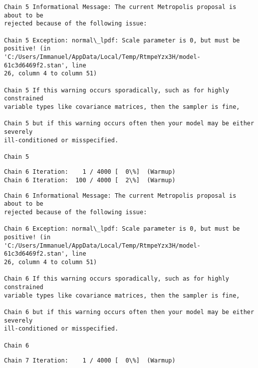 \documentclass[11pt]{article}
\begin{document}
    \begin{Verbatim}[commandchars=\\\{\}]
Chain 5 Informational Message: The current Metropolis proposal is about to be
rejected because of the following issue:

Chain 5 Exception: normal\_lpdf: Scale parameter is 0, but must be positive! (in
'C:/Users/Immanuel/AppData/Local/Temp/RtmpeYzx3H/model-61c3d6469f2.stan', line
26, column 4 to column 51)

Chain 5 If this warning occurs sporadically, such as for highly constrained
variable types like covariance matrices, then the sampler is fine,

Chain 5 but if this warning occurs often then your model may be either severely
ill-conditioned or misspecified.

Chain 5

    \end{Verbatim}

    \begin{Verbatim}[commandchars=\\\{\}]
Chain 6 Iteration:    1 / 4000 [  0\%]  (Warmup)
Chain 6 Iteration:  100 / 4000 [  2\%]  (Warmup)
    \end{Verbatim}

    \begin{Verbatim}[commandchars=\\\{\}]
Chain 6 Informational Message: The current Metropolis proposal is about to be
rejected because of the following issue:

Chain 6 Exception: normal\_lpdf: Scale parameter is 0, but must be positive! (in
'C:/Users/Immanuel/AppData/Local/Temp/RtmpeYzx3H/model-61c3d6469f2.stan', line
26, column 4 to column 51)

Chain 6 If this warning occurs sporadically, such as for highly constrained
variable types like covariance matrices, then the sampler is fine,

Chain 6 but if this warning occurs often then your model may be either severely
ill-conditioned or misspecified.

Chain 6

    \end{Verbatim}

    \begin{Verbatim}[commandchars=\\\{\}]
Chain 7 Iteration:    1 / 4000 [  0\%]  (Warmup)
    \end{Verbatim}
\end{document}
